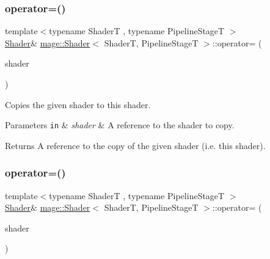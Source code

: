 \subsubsection{\texorpdfstring{operator=()}{operator=()}\hspace{0.1cm}{\footnotesize\ttfamily [1/2]}}
{\footnotesize\ttfamily template$<$typename ShaderT , typename Pipeline\+StageT $>$ \\
\hyperlink{classmage_1_1_shader}{Shader}\& \hyperlink{classmage_1_1_shader}{mage\+::\+Shader}$<$ ShaderT, Pipeline\+StageT $>$\+::operator= (\begin{DoxyParamCaption}\item[{const \hyperlink{classmage_1_1_shader}{Shader}$<$ ShaderT, Pipeline\+StageT $>$ \&}]{shader }\end{DoxyParamCaption})\hspace{0.3cm}{\ttfamily [delete]}}

Copies the given shader to this shader.


\begin{DoxyParams}[1]{Parameters}
\mbox{\tt in}  & {\em shader} & A reference to the shader to copy. \\
\hline
\end{DoxyParams}
\begin{DoxyReturn}{Returns}
A reference to the copy of the given shader (i.\+e. this shader). 
\end{DoxyReturn}
\hypertarget{classmage_1_1_shader_acf5ea10f8309e1f71eb2a843480c11a8}{}\label{classmage_1_1_shader_acf5ea10f8309e1f71eb2a843480c11a8} 
\subsubsection{\texorpdfstring{operator=()}{operator=()}\hspace{0.1cm}{\footnotesize\ttfamily [2/2]}}
{\footnotesize\ttfamily template$<$typename ShaderT , typename Pipeline\+StageT $>$ \\
\hyperlink{classmage_1_1_shader}{Shader}\& \hyperlink{classmage_1_1_shader}{mage\+::\+Shader}$<$ ShaderT, Pipeline\+StageT $>$\+::operator= (\begin{DoxyParamCaption}\item[{\hyperlink{classmage_1_1_shader}{Shader}$<$ ShaderT, Pipeline\+StageT $>$ \&\&}]{shader }\end{DoxyParamCaption})\hspace{0.3cm}{\ttfamily [noexcept]}}

